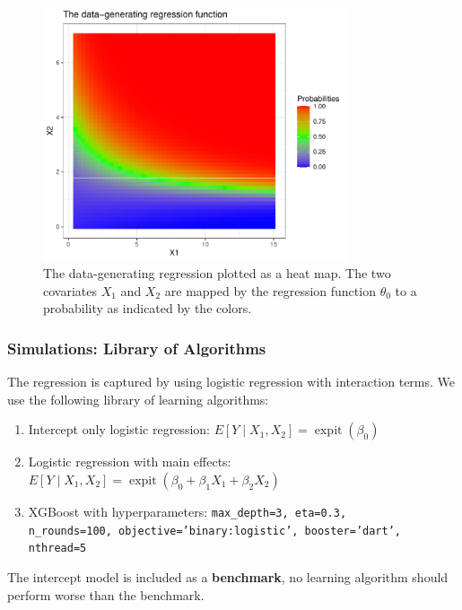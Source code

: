 \documentclass{beamer}
\DeclareMathOperator{\expit}{expit}
\begin{document}
\begin{frame}
\begin{figure}[H]
    \centering
    \includegraphics[width=0.8\textwidth]{figures/trueplot.pdf}
    \caption{The data-generating regression plotted as a heat map. The two covariates $ X_1 $ and $ X_2 $ are mapped by the regression function $ \theta_0 $ to a probability as indicated by the colors.}
    \label{fig:trueplot}
\end{figure}
\end{frame}


\begin{frame}
    \frametitle{Simulations: Library of Algorithms} 
The regression is captured by using logistic regression with interaction terms. We use the following library of learning algorithms:
\begin{enumerate}
    \item Intercept only logistic regression: $E[Y \mid X_1, X_2] = \expit(\beta_0)$
    \item Logistic regression with main effects: $E[Y \mid X_1, X_2] = \expit(\beta_0 + \beta_1 X_1 + \beta_2 X_2)$
    \item XGBoost with hyperparameters: \texttt{max\_depth=3, eta=0.3,\\ n\_rounds=100, objective='binary:logistic', booster='dart', nthread=5}
\end{enumerate}
The intercept model is included as a \textbf{benchmark}, no learning algorithm should perform worse than the benchmark. 
\end{frame}
\end{document}
